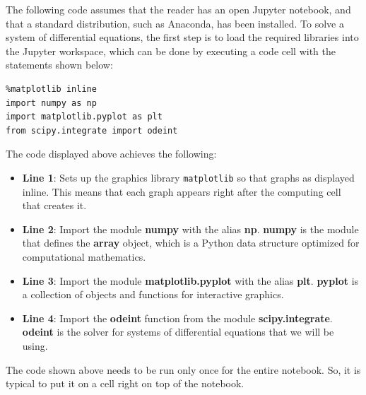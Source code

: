 The following code assumes that the reader has an open Jupyter notebook, and that a standard distribution, such as Anaconda, has been installed. To solve a system of differential equations, the first step is to load the required libraries into the Jupyter workspace, which can be done by executing a code cell with the statements shown below:
\begin{lstlisting}
%matplotlib inline
import numpy as np
import matplotlib.pyplot as plt
from scipy.integrate import odeint
\end{lstlisting}
The code displayed above achieves the following:
\begin{itemize}
\item \textbf{Line 1}: Sets up the graphics library \texttt{matplotlib} so that graphs as displayed inline. This means that each graph appears right after the computing cell that creates it.
\item \textbf{Line 2}: Import the module \textbf{numpy} with the alias \textbf{np}. \textbf{numpy} is the module that defines the \textbf{array} object, which is a Python data structure optimized for computational mathematics.
\item \textbf{Line 3}: Import the module \textbf{matplotlib.pyplot} with the alias \textbf{plt}. \textbf{pyplot} is a collection of objects and functions for interactive graphics.
\item \textbf{Line 4}: Import the \textbf{odeint} function from the module \textbf{scipy.integrate}. \textbf{odeint} is the solver for systems of differential equations that we will be using.
\end{itemize}

The code shown above needs to be run only once for the entire notebook. So, it is typical to put it on a cell right on top of the notebook.

